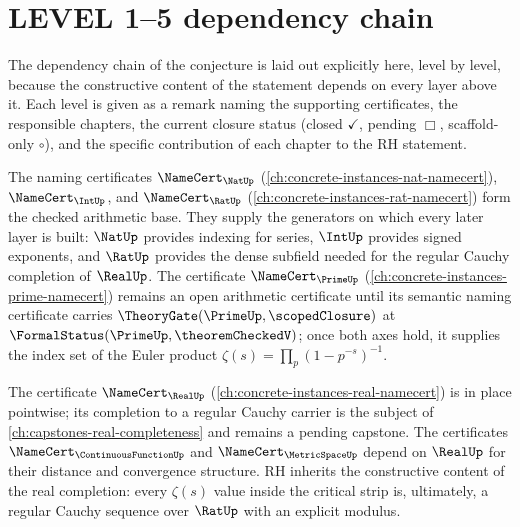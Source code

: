 \section{LEVEL 1--5 dependency chain}
\label{sec:rh-dependency-chain}

The dependency chain of the conjecture is laid out explicitly here, level by level, because the constructive content of the statement depends on every layer above it. Each level is given as a remark naming the supporting certificates, the responsible chapters, the current closure status (closed $\checkmark$, pending $\Box$, scaffold-only $\circ$), and the specific contribution of each chapter to the RH statement.

\begin{remark}
\label{rem:rh-level-1}
The naming certificates $\NameCert_{\NatUp}$ (\autoref{ch:concrete-instances-nat-namecert}), $\NameCert_{\IntUp}$, and $\NameCert_{\RatUp}$ (\autoref{ch:concrete-instances-rat-namecert}) form the checked arithmetic base. They supply the generators on which every later layer is built: $\NatUp$ provides indexing for series, $\IntUp$ provides signed exponents, and $\RatUp$ provides the dense subfield needed for the regular Cauchy completion of $\RealUp$. The certificate $\NameCert_{\PrimeUp}$ (\autoref{ch:concrete-instances-prime-namecert}) remains an open arithmetic certificate until its semantic naming certificate carries $\TheoryGate(\PrimeUp, \scopedClosure)$ at $\FormalStatus(\PrimeUp, \theoremCheckedV)$; once both axes hold, it supplies the index set of the Euler product $\zeta(s) = \prod_{p} (1 - p^{-s})^{-1}$.
\end{remark}

\begin{remark}
\label{rem:rh-level-2}
The certificate $\NameCert_{\RealUp}$ (\autoref{ch:concrete-instances-real-namecert}) is in place pointwise; its completion to a regular Cauchy carrier is the subject of \autoref{ch:capstones-real-completeness} and remains a pending capstone. The certificates $\NameCert_{\ContinuousFunctionUp}$ and $\NameCert_{\MetricSpaceUp}$ depend on $\RealUp$ for their distance and convergence structure. RH inherits the constructive content of the real completion: every $\zeta(s)$ value inside the critical strip is, ultimately, a regular Cauchy sequence over $\RatUp$ with an explicit modulus.
\end{remark}

